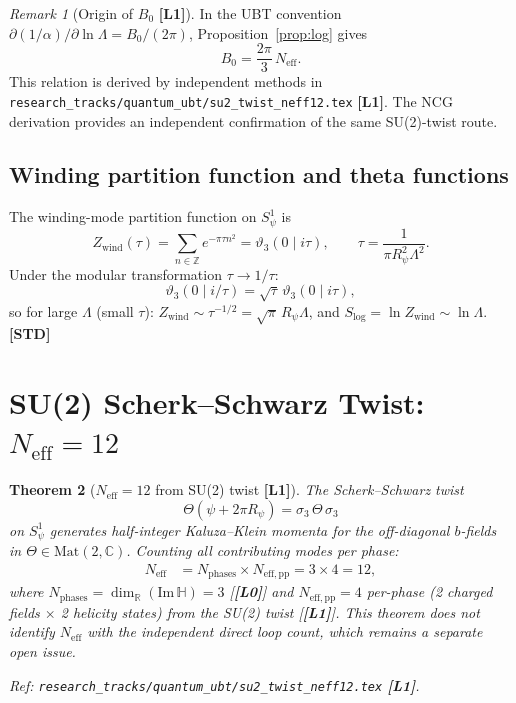 \documentclass[12pt,a4paper]{article}
\newtheorem{theorem}{Theorem}[section]
\theoremstyle{definition}
\theoremstyle{remark}
\newtheorem{remark}[theorem]{Remark}
\newcommand{\Lone}{\textbf{[L1]}}
\newcommand{\Lzero}{\textbf{[L0]}}
\newcommand{\STD}{\textbf{[STD]}}
\newcommand{\CC}{\mathbb{C}}
\newcommand{\Neff}{N_{\mathrm{eff}}}
\begin{document}
\begin{remark}[Origin of $B_0$ \Lone]
\label{rem:B0}
In the UBT convention $\partial(1/\alpha)/\partial\ln\Lambda = B_0/(2\pi)$,
Proposition~\ref{prop:log} gives
\begin{equation}
\boxed{B_0 = \frac{2\pi}{3}\,\Neff.}
\label{eq:B0NCG}
\end{equation}
This relation is derived by independent methods in
\texttt{research\_tracks/quantum\_ubt/su2\_twist\_neff12.tex} \Lone.
The NCG derivation provides an independent confirmation of the same SU(2)-twist route.
\end{remark}

\subsection{Winding partition function and theta functions}

The winding-mode partition function on $S^1_\psi$ is
\begin{equation}
Z_{\mathrm{wind}}(\tau)
= \sum_{n\in\mathbb{Z}} e^{-\pi\tau n^2}
= \vartheta_3(0\mid i\tau),
\qquad \tau = \frac{1}{\pi R_\psi^2\Lambda^2}.
\label{eq:Zwind}
\end{equation}
Under the modular transformation $\tau\to 1/\tau$:
\begin{equation}
\vartheta_3(0\mid i/\tau) = \sqrt{\tau}\,\vartheta_3(0\mid i\tau),
\end{equation}
so for large $\Lambda$ (small $\tau$):
$Z_{\mathrm{wind}} \sim \tau^{-1/2} = \sqrt{\pi}\,R_\psi\Lambda$,
and $S_{\mathrm{log}} = \ln Z_{\mathrm{wind}} \sim \ln\Lambda$. \STD

\section{SU(2) Scherk--Schwarz Twist: $\Neff = 12$}
\label{sec:neff}

\begin{theorem}[$\Neff = 12$ from SU(2) twist \Lone]
\label{thm:neff12}
The Scherk--Schwarz twist
\[
\Theta(\psi + 2\pi R_\psi) = \sigma_3\,\Theta\,\sigma_3
\]
on $S^1_\psi$ generates half-integer Kaluza--Klein momenta for the
off-diagonal $b$-fields in $\Theta\in\mathrm{Mat}(2,\CC)$.
Counting all contributing modes per phase:
\begin{align*}
\Neff &= N_{\mathrm{phases}} \times N_{\mathrm{eff,pp}}
       = 3 \times 4 = 12,
\end{align*}
where $N_{\mathrm{phases}} = \dim_\mathbb{R}(\mathrm{Im}\,\mathbb{H}) = 3$
[\Lzero] and $N_{\mathrm{eff,pp}} = 4$ per-phase (2 charged fields $\times$
2 helicity states) from the SU(2) twist [\Lone].
This theorem does not identify $\Neff$ with the independent direct loop count,
which remains a separate open issue.

Ref: \texttt{research\_tracks/quantum\_ubt/su2\_twist\_neff12.tex} \Lone.
\end{theorem}
\end{document}
